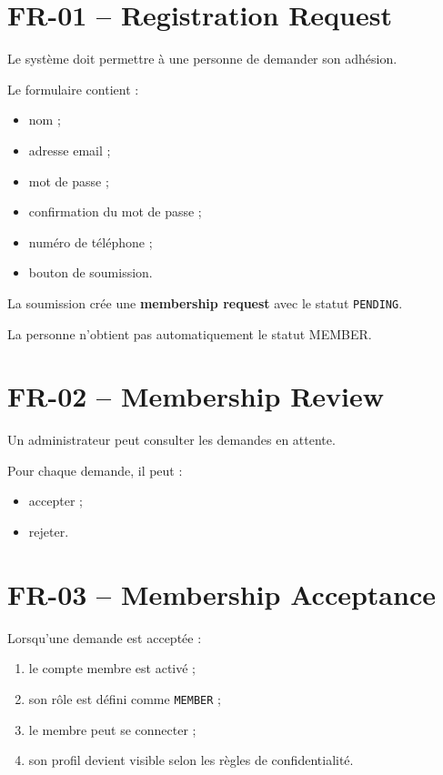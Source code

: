 \documentclass[11pt,a4paper]{report}
\begin{document}
\section{FR-01 -- Registration Request}

Le système doit permettre à une personne de demander son adhésion.

Le formulaire contient :

\begin{itemize}
    \item nom ;
    \item adresse email ;
    \item mot de passe ;
    \item confirmation du mot de passe ;
    \item numéro de téléphone ;
    \item bouton de soumission.
\end{itemize}

La soumission crée une \textbf{membership request} avec le statut \texttt{PENDING}.

La personne n'obtient pas automatiquement le statut MEMBER.

\section{FR-02 -- Membership Review}

Un administrateur peut consulter les demandes en attente.

Pour chaque demande, il peut :

\begin{itemize}
    \item accepter ;
    \item rejeter.
\end{itemize}

\section{FR-03 -- Membership Acceptance}

Lorsqu'une demande est acceptée :

\begin{enumerate}
    \item le compte membre est activé ;
    \item son rôle est défini comme \texttt{MEMBER} ;
    \item le membre peut se connecter ;
    \item son profil devient visible selon les règles de confidentialité.
\end{enumerate}
\end{document}
